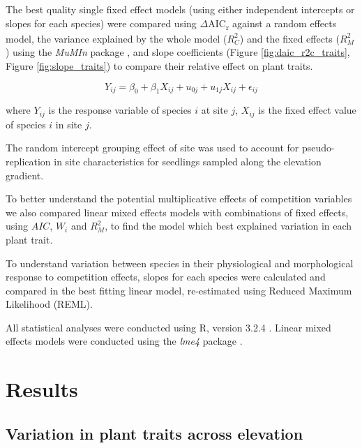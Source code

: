 \documentclass[a4paper, 11pt]{article}
\begin{document}
The best quality single fixed effect models (using either independent intercepts or slopes for each species) were compared using $\Delta$AIC\textsubscript{r} against a random effects model,  the variance explained by the whole model ($R_C^2$) and the fixed effects ($R_M^2$) using the \textit{MuMIn} package \citep{MuMIn_weevils}, and slope coefficients (Figure \ref{fig:daic_r2c_traits}, Figure \ref{fig:slope_traits}) to compare their relative effect on plant traits. 

\begin{equation}
\label{eq:model}
Y_{ij} = \beta_{0} + \beta_{1}X_{ij} + u_{0j} + u_{1j}X_{ij} + \epsilon_{ij}
\end{equation}

where $Y_{ij}$ is the response variable of species $i$ at site $j$, $X_{ij}$ is the fixed effect value of species $i$ in site $j$.



The random intercept grouping effect of site was used to account for pseudo-replication in site characteristics for seedlings sampled along the elevation gradient.

To better understand the potential multiplicative effects of competition variables we also compared linear mixed effects models with combinations of fixed effects, using $AIC$, $W_i$ and $R_M^2$, to find the model which best explained variation in each plant trait.

To understand variation between species in their physiological and morphological response to competition effects, slopes for each species were calculated and compared in the best fitting linear model, re-estimated using Reduced Maximum Likelihood (REML). 



All statistical analyses were conducted using R, version 3.2.4 \citep{R2019}. Linear mixed effects models were conducted using the \textit{lme4} package \citep{Bates2015}.

\section{Results}

\subsection{Variation in plant traits across elevation}
\end{document}
